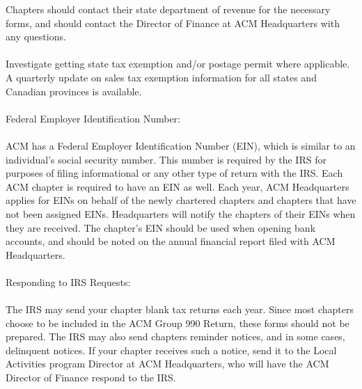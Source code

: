 Chapters should contact their state department of revenue for the necessary
forms, and should contact the Director of Finance at ACM Headquarters with any
questions.
\\
\\
Investigate getting state tax exemption and/or postage permit where applicable.
A quarterly update on sales tax exemption information for all states and Canadian
provinces is available.
\\
\\
Federal Employer Identification Number:
\\
\\
ACM has a Federal Employer Identification Number (EIN), which is similar to an
individual's social security number. This number is required by the IRS for
purposes of filing informational or any other type of return with the IRS. Each
ACM chapter is required to have an EIN as well. Each year, ACM Headquarters
applies for EINs on behalf of the newly chartered chapters and chapters that
have not been assigned EINs. Headquarters will notify the chapters of their EINs
when they are received. The chapter's EIN should be used when opening bank
accounts, and should be noted on the annual financial report filed with ACM
Headquarters.
\\
\\
Responding to IRS Requests:
\\
\\
The IRS may send your chapter blank tax returns each year. Since most chapters
choose to be included in the ACM Group 990 Return, these forms should not be
prepared. The IRS may also send chapters reminder notices, and in some cases,
delinquent notices. If your chapter receives such a notice, send it to the Local
Activities program Director at ACM Headquarters, who will have the ACM Director
of Finance respond to the IRS.


